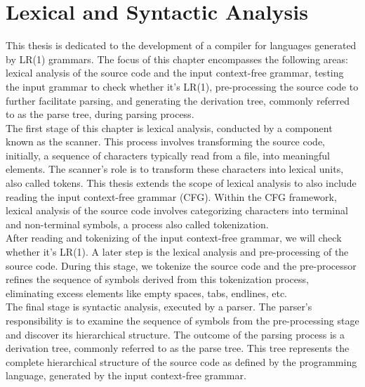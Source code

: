 \chapter{Lexical and Syntactic Analysis}\label{ch:Lexical and Syntactic Analysis}

This thesis is dedicated to the development of a compiler for languages generated by LR(1) grammars. The focus of this chapter encompasses the following areas: lexical analysis of the source code and the input context-free grammar, testing the input grammar to check whether it's LR(1), pre-processing the source code to further facilitate parsing, and generating the derivation tree, commonly referred to as the parse tree, during parsing process.\\

The first stage of this chapter is lexical analysis, conducted by a component known as the scanner. This process involves transforming the source code, initially, a sequence of characters typically read from a file, into meaningful elements. The scanner's role is to transform these characters into lexical units, also called tokens. This thesis extends the scope of lexical analysis to also include reading the input context-free grammar (CFG). Within the CFG framework, lexical analysis of the source code involves categorizing characters into terminal and non-terminal symbols, a process also called tokenization.\\

After reading and tokenizing of the input context-free grammar, we will check whether it's LR(1). A later step is the lexical analysis and pre-processing of the source code. During this stage, we tokenize the source code and the pre-processor refines the sequence of symbols derived from this tokenization process, eliminating excess elements like empty spaces, tabs, endlines, etc.\\

The final stage is syntactic analysis, executed by a parser. The parser's responsibility is to examine the sequence of symbols from the pre-processing stage and discover its hierarchical structure. The outcome of the parsing process is a derivation tree, commonly referred to as the parse tree. This tree represents the complete hierarchical structure of the source code as defined by the programming language, generated by the input context-free grammar.\\

